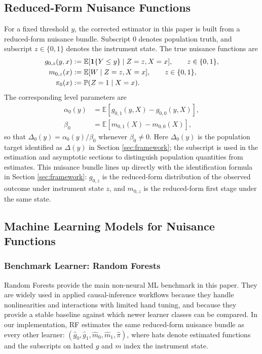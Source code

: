\documentclass[final,3p,fleqn, 10pt]{elsarticle}
\begin{document}
\subsection{Reduced-Form Nuisance Functions}
For a fixed threshold $y$, the corrected estimator in this paper is built from a reduced-form nuisance bundle. Subscript $0$ denotes population truth, and subscript $z\in\{0,1\}$ denotes the instrument state. The true nuisance functions are
\begin{align*}
g_{0,z}(y, x) &:= \mathbb{E}[\mathbf{1}\{Y \le y\} \mid Z=z, X=x], \qquad z \in \{0,1\},\\
m_{0,z}(x) &:= \mathbb{E}[W \mid Z=z, X=x], \qquad z \in \{0,1\},\\
\pi_0(x) &:= \mathbb{P}(Z=1 \mid X=x).
\end{align*}
The corresponding level parameters are
\begin{align*}
\alpha_0(y) &= \mathbb{E}[g_{0,1}(y, X) - g_{0,0}(y, X)],\\
\beta_0 &= \mathbb{E}[m_{0,1}(X) - m_{0,0}(X)],
\end{align*}
so that $\Delta_0(y) = \alpha_0(y) / \beta_0$ whenever $\beta_0 \neq 0$. Here $\Delta_0(y)$ is the population target identified as $\Delta(y)$ in Section \ref{sec:framework}; the subscript is used in the estimation and asymptotic sections to distinguish population quantities from estimates. This nuisance bundle lines up directly with the identification formula in Section \ref{sec:framework}: $g_{0,z}$ is the reduced-form distribution of the observed outcome under instrument state $z$, and $m_{0,z}$ is the reduced-form first stage under the same state.

\subsection{Machine Learning Models for Nuisance Functions}

\subsubsection{Benchmark Learner: Random Forests}
Random Forests provide the main non-neural ML benchmark in this paper. They are widely used in applied causal-inference workflows because they handle nonlinearities and interactions with limited hand tuning, and because they provide a stable baseline against which newer learner classes can be compared. In our implementation, RF estimates the same reduced-form nuisance bundle as every other learner: $(\hat{g}_0, \hat{g}_1, \hat{m}_0, \hat{m}_1, \hat{\pi})$, where hats denote estimated functions and the subscripts on hatted $g$ and $m$ index the instrument state.
\end{document}

